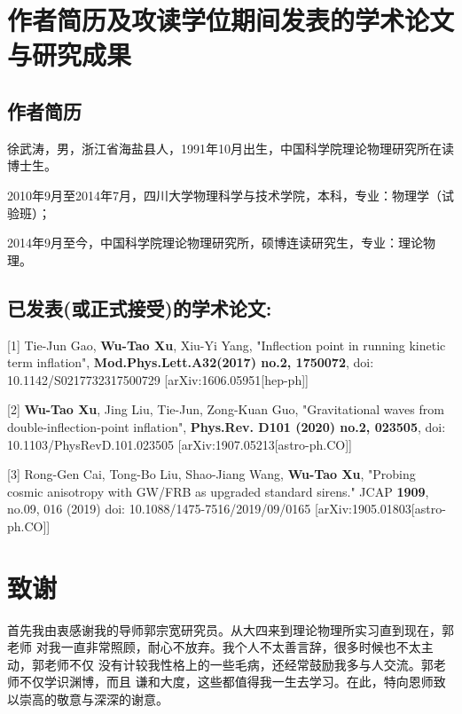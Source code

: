 \chapter{作者简历及攻读学位期间发表的学术论文与研究成果}

\section*{作者简历}

徐武涛，男，浙江省海盐县人，1991年10月出生，中国科学院理论物理研究所在读博士生。

2010年9月至2014年7月，四川大学物理科学与技术学院，本科，专业：物理学（试验班）；

2014年9月至今，中国科学院理论物理研究所，硕博连读研究生，专业：理论物理。

\section*{已发表(或正式接受)的学术论文:}

[1] Tie-Jun Gao, \textbf{Wu-Tao Xu}, Xiu-Yi Yang, "Inflection point in
running kinetic term inflation", \textbf{Mod.Phys.Lett.A32(2017) no.2,
1750072}, doi: 10.1142/S0217732317500729 [arXiv:1606.05951[hep-ph]]

[2] \textbf{Wu-Tao Xu}, Jing Liu, Tie-Jun, Zong-Kuan Guo, "Gravitational
waves from double-inflection-point inflation", \textbf{Phys.Rev. D101
(2020) no.2, 023505}, doi: 10.1103/PhysRevD.101.023505
[arXiv:1907.05213[astro-ph.CO]]

[3] Rong-Gen Cai, Tong-Bo Liu, Shao-Jiang Wang, \textbf{Wu-Tao Xu}, "Probing 
cosmic anisotropy with GW/FRB as upgraded standard sirens." JCAP
\textbf{1909}, no.09, 016 (2019) doi: 10.1088/1475-7516/2019/09/0165 
[arXiv:1905.01803[astro-ph.CO]]

\chapter[致谢]{致\quad 谢}%
\thispagestyle{noheaderstyle}%

首先我由衷感谢我的导师郭宗宽研究员。从大四来到理论物理所实习直到现在，郭老师
对我一直非常照顾，耐心不放弃。我个人不太善言辞，很多时候也不太主动，郭老师不仅
没有计较我性格上的一些毛病，还经常鼓励我多与人交流。郭老师不仅学识渊博，而且
谦和大度，这些都值得我一生去学习。在此，特向恩师致以崇高的敬意与深深的谢意。

